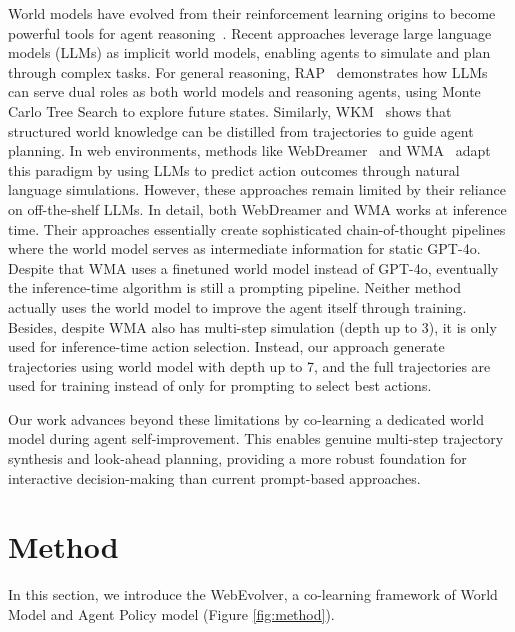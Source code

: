 \documentclass[11pt]{article}
\begin{document}
World models have evolved from their reinforcement learning origins \citep{world_model} to become powerful tools for agent reasoning~\cite{DBLP:journals/corr/abs-2408-14837, DBLP:conf/nips/AlonsoJMKSPF24, DBLP:journals/corr/abs-2305-14223}. Recent approaches leverage large language models (LLMs) as implicit world models, enabling agents to simulate and plan through complex tasks. For general reasoning, RAP~\citep{RAP_world_model} demonstrates how LLMs can serve dual roles as both world models and reasoning agents, using Monte Carlo Tree Search to explore future states. Similarly, WKM~\citep{agent_world_model} shows that structured world knowledge can be distilled from trajectories to guide agent planning.
In web environments, methods like WebDreamer~\citep{webdreamer} and WMA~\citep{web_agent_world_model} adapt this paradigm by using LLMs to predict action outcomes through natural language simulations.
However, these approaches remain limited by their reliance on off-the-shelf LLMs.
In detail, both WebDreamer and WMA works at inference time. Their approaches essentially create sophisticated chain-of-thought pipelines where the world model serves as intermediate information for static GPT-4o. Despite that WMA uses a finetuned world model instead of GPT-4o, eventually the inference-time algorithm is still a prompting pipeline. Neither method actually uses the world model to improve the agent itself through training.
Besides, despite WMA also has multi-step simulation (depth up to 3), it is only used for inference-time action selection. Instead, our approach generate trajectories using world model with depth up to 7, and the full trajectories are used for training instead of only for prompting to select best actions.

Our work advances beyond these limitations by co-learning a dedicated world model during agent self-improvement. This enables genuine multi-step trajectory synthesis and look-ahead planning, providing a more robust foundation for interactive decision-making than current prompt-based approaches.




\section{Method}


In this section, we introduce the WebEvolver, a co-learning framework of World Model and Agent Policy model (Figure \ref{fig:method}). 
\end{document}
